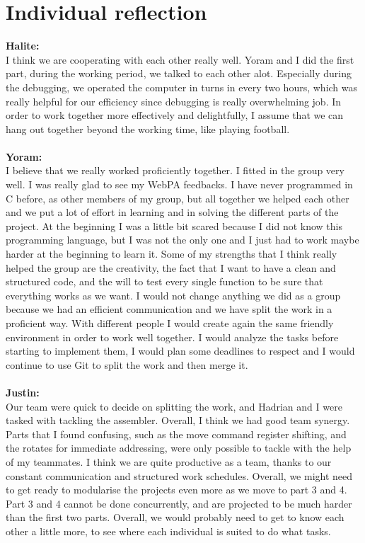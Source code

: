 \documentclass[a4paper]{article}
\begin{document}
\section{Individual reflection}
\textbf{Halite:}\\
I think we are cooperating with each other really well. Yoram and I did the first part, during the working period, we talked to each other alot. Especially during the debugging, we operated the computer in turns in every two hours, which was really helpful for our efficiency since debugging is really overwhelming job. In order to work together more effectively and delightfully, I assume that we can hang out together beyond the working time, like playing football.\\
\\
\textbf{Yoram:}\\
I believe that we really worked proficiently together. I fitted in the group very well. I was really glad to see my WebPA feedbacks. I have never programmed in C before, as other members of my group, but all together we helped each other and we put a lot of effort in learning and in solving the different parts of the project. At the beginning I was a little bit scared because I did not know this programming language, but I was not the only one and I just had to work maybe harder at the beginning to learn it. Some of my strengths that I think really helped the group are the creativity, the fact that I want to have a clean and structured code, and the will to test every single function to be sure that everything works as we want.
I would not change anything we did as a group because we had an efficient communication and we have split the work in a proficient way. With different people I would create again the same friendly environment in order to work well together. I would analyze the tasks before starting to implement them, I would plan some deadlines to respect and I would continue to use Git to split the work and then merge it. 
\\\\
\textbf{Justin:}\\
Our team were quick to decide on splitting the work, and Hadrian and I were tasked with tackling the assembler. Overall, I think we had good team synergy. Parts that I found confusing, such as the move command register shifting, and the rotates for immediate addressing, were only possible to tackle with the help of my teammates. I think we are quite productive as a team, thanks to our constant communication and structured work schedules. Overall, we might need to get ready to modularise the projects even more as we move to part 3 and 4. Part 3 and 4 cannot be done concurrently, and are projected to be much harder than the first two parts. Overall, we would probably need to get to know each other a little more, to see where each individual is suited to do what tasks.\\
\end{document}
